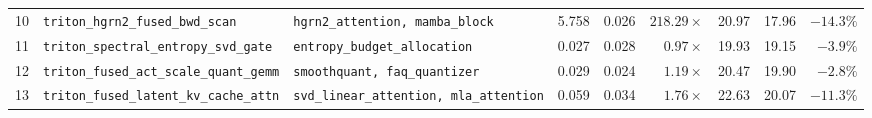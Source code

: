 \begin{table}[t]
\begin{tabular}{rllrrrrrr}
10 & \texttt{triton\_hgrn2\_fused\_bwd\_scan} & \texttt{hgrn2\_attention, mamba\_block} & 5.758 & 0.026 & $\mathbf{218.29\times}$ & 20.97 & 17.96 & $\mathbf{-14.3\%}$ \\
11 & \texttt{triton\_spectral\_entropy\_svd\_gate} & \texttt{entropy\_budget\_allocation} & 0.027 & 0.028 & $0.97\times$ & 19.93 & 19.15 & $-3.9\%$ \\
12 & \texttt{triton\_fused\_act\_scale\_quant\_gemm} & \texttt{smoothquant, faq\_quantizer} & 0.029 & 0.024 & $\mathbf{1.19\times}$ & 20.47 & 19.90 & $-2.8\%$ \\
13 & \texttt{triton\_fused\_latent\_kv\_cache\_attn} & \texttt{svd\_linear\_attention, mla\_attention} & 0.059 & 0.034 & $\mathbf{1.76\times}$ & 22.63 & 20.07 & $\mathbf{-11.3\%}$ \\
\bottomrule
\end{tabular}
\end{table}
